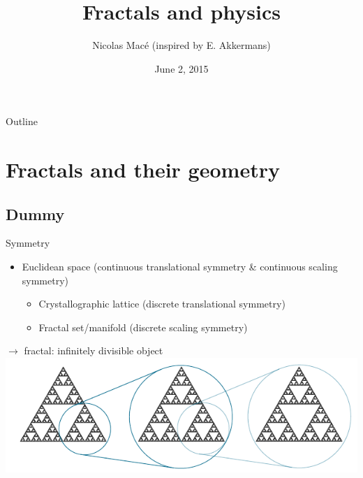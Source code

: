 \documentclass[xcolor=x11names,compress,professionalfonts]{beamer}
\renewcommand{\(}{\begin{columns}}
\renewcommand{\)}{\end{columns}}
\newcommand{\<}[1]{\begin{column}{#1}}
\renewcommand{\>}{\end{column}}
\begin{document}
\begin{frame}
\title{Fractals and physics}
\author{ Nicolas Macé (inspired by E. Akkermans) }
\date{
	June 2, 2015
}
\titlepage
\end{frame}


\begin{frame}{Outline}
    \tableofcontents[hideallsubsections]
\end{frame}

\section{Fractals and their geometry}
\subsection{Dummy}

\begin{frame}{Symmetry}
    \begin{itemize}
        \item Euclidean space (continuous translational symmetry \& continuous scaling symmetry)
            \begin{itemize}
                \item Crystallographic lattice (discrete translational symmetry)
                \item Fractal set/manifold (discrete scaling symmetry)
            \end{itemize}
    \end{itemize}
    
    $\rightarrow$ fractal: infinitely divisible object
    \includegraphics[scale=1.00]{sierpinski.pdf}
\end{frame}
\end{document}
